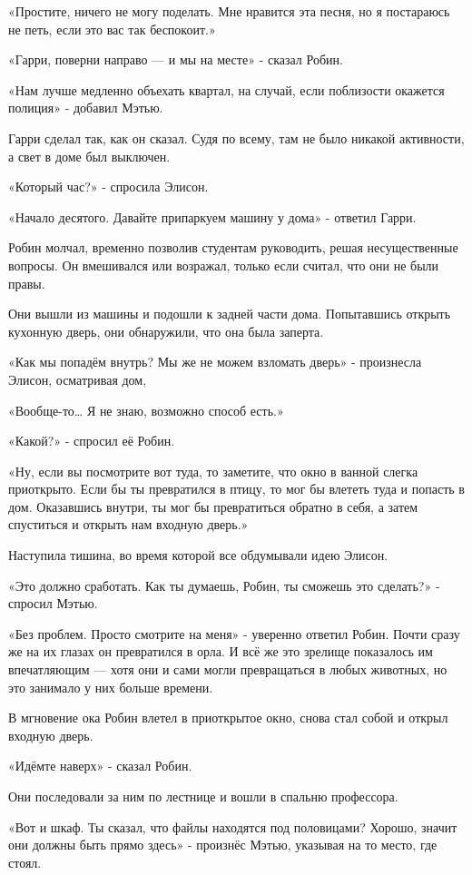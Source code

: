 \documentclass[a5paper, 9pt,
final, openany, twoside=true]{memoir}
\begin{document}
«Простите, ничего не могу поделать. Мне нравится эта песня, но я постараюсь не петь, если это вас так беспокоит.»

«Гарри, поверни направо — и мы на месте» - сказал Робин.

«Нам лучше медленно объехать квартал, на случай, если поблизости окажется полиция» - добавил Мэтью.

Гарри сделал так, как он сказал. Судя по всему, там не было никакой активности, а свет в доме был выключен.

«Который час?» - спросила Элисон.

«Начало десятого. Давайте припаркуем машину у дома» - ответил Гарри.

Робин молчал, временно позволив студентам руководить, решая несущественные вопросы. Он вмешивался или возражал, только если считал, что они не были правы.

Они вышли из машины и подошли к задней части дома. Попытавшись открыть кухонную дверь, они обнаружили, что она была заперта.

«Как мы попадём внутрь? Мы же не можем взломать дверь» - произнесла Элисон, осматривая дом,

«Вообще-то… Я не знаю, возможно способ есть.»

«Какой?» - спросил её Робин.

«Ну, если вы посмотрите вот туда, то заметите, что окно в ванной слегка приоткрыто. Если бы ты превратился в птицу, то мог бы влететь туда и попасть в дом. Оказавшись внутри, ты мог бы превратиться обратно в себя, а затем спуститься и открыть нам входную дверь.»

Наступила тишина, во время которой все обдумывали идею Элисон.

«Это должно сработать. Как ты думаешь, Робин, ты сможешь это сделать?» - спросил Мэтью.

«Без проблем. Просто смотрите на меня» - уверенно ответил Робин. Почти сразу же на их глазах он превратился в орла. И всё же это зрелище показалось им впечатляющим — хотя они и сами могли превращаться в любых животных, но это занимало у них больше времени.

В мгновение ока Робин влетел в приоткрытое окно, снова стал собой и открыл входную дверь.

«Идёмте наверх» - сказал Робин.

Они последовали за ним по лестнице и вошли в спальню профессора.

«Вот и шкаф. Ты сказал, что файлы находятся под половицами? Хорошо, значит они должны быть прямо здесь» - произнёс Мэтью, указывая на то место, где стоял.
\end{document}
